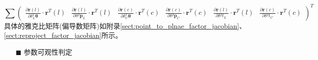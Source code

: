 \begin{equation*}
  \sum\begin{pmatrix}
    \frac{\partial \boldsymbol{r}(l)}{\partial \delta {^{I}_{L}\boldsymbol{\theta}}}\cdot\boldsymbol{r}^T(l) &
    \frac{\partial \boldsymbol{r}(l)}{\partial \delta {^{I}\boldsymbol{p}_L}}\cdot\boldsymbol{r}^T(l)        &
    \frac{\partial \boldsymbol{r}(c)}{\partial \delta {^{I}_{C}\boldsymbol{\theta}}}\cdot\boldsymbol{r}^T(c) &
    \frac{\partial \boldsymbol{r}(c)}{\partial \delta {^{I}\boldsymbol{p}_C}}\cdot\boldsymbol{r}^T(c)        &
    \frac{\partial \boldsymbol{r}(l)}{\partial \delta {^{I}t_{L}}}\cdot\boldsymbol{r}^T(l)                   &
    \frac{\partial \boldsymbol{r}(c)}{\partial \delta {^{I}t_{C}}}\cdot\boldsymbol{r}^T(c)
  \end{pmatrix}^T
\end{equation*}
具体的雅克比矩阵(偏导数矩阵)如附录\ref{sect:point_to_plnae_factor_jacobian}、\ref{sect:reproject_factor_jacobian}所示。

\begin{itemize}
  \item[$\blacksquare$]参数可观性判定
\end{itemize}

